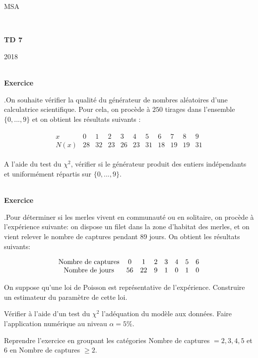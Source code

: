 \documentclass[11pt,a4paper]{article}
\def \ni{\noindent}
\def\beqs{\begin{eqnarray*}}
\def\enqs{\end{eqnarray*}}
\newcounter{exo}
\def\exo{\mbox{}\\[0em]\hspace*{0em}\bf Exercice
\addtocounter{exo}{1}\arabic{exo}.\rm\hspace{1ex}}
\begin{document}
\centerline{\sc MSA}  \centerline{~}
\vskip1cm \centerline{{\bf TD 7}} \centerline{2018}

\exo On souhaite vérifier la qualité du générateur de nombres
aléatoires d'une calculatrice scientifique. Pour cela, on procède
à $250$ tirages dans l'ensemble $\{0,...,9\}$ et on obtient les
résultats suivants :

\beqs\begin{array}{ccccccccccc}
x & 0 &1&2&3&4&5&6&7&8&9 \\
N(x) & 28&32&23 &26 &23 &31 &18 &19 &19 &31
\end{array}
\enqs

A l'aide du test du $\chi^2$, vérifier si le générateur produit
des entiers indépendants et uniformément répartis sur
$\{0,...,9\}$.


\exo Pour déterminer si les merles vivent en communauté ou en
solitaire, on procède à l'expérience suivante: on dispose un filet
dans la zone d'habitat des merles, et on vient relever le nombre
de captures pendant 89 jours. On obtient les résultats suivants:

\beqs\begin{array}{cccccccc}
\hbox{Nombre de captures} & 0 &1&2&3&4&5&6 \\
\hbox{Nombre de jours} &56&22&9&1&0&1&0
\end{array}
\enqs

\ni {\bf 1.} On suppose qu'une loi de Poisson est représentative
de l'expérience. Construire un estimateur du paramètre de cette
loi.

\vspace{1mm}

\ni {\bf 2.} Vérifier à l'aide d'un test du $\chi^2$ l'adéquation
du modèle aux données. Faire l'application numérique au niveau
$\alpha = 5\%$.

\vspace{1mm}


\ni {\bf 3.} Reprendre l'exercice en groupant les catégories
Nombre de captures $= 2, 3, 4, 5$ et $6$ en Nombre de captures
$\geq 2$.

%
%
%
%
%
%
%
%
%
%
%
\end{document}
